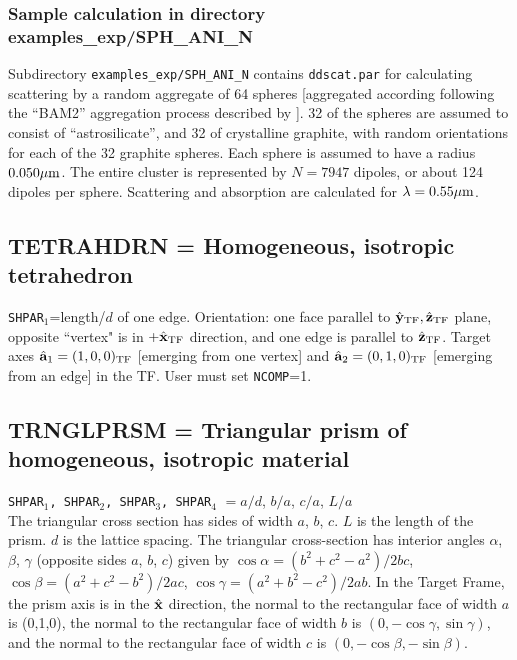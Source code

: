 \subsubsection{\bf Sample calculation in directory examples\_exp/SPH\_ANI\_N}

Subdirectory {\tt examples\_exp/SPH\_ANI\_N} contains {\tt ddscat.par} for
calculating scattering by a random aggregate of 64 spheres
[aggregated according following the ``BAM2'' aggregation process
described by \citet{Shen+Draine+Johnson_2008}].
32 of the spheres are assumed to consist of ``astrosilicate'', and
32 of crystalline graphite, with random orientations for each of the 32
graphite spheres.
Each sphere is assumed to have a radius $0.050{\mu{\rm m}}$.
The entire cluster is represented by $N=7947$ dipoles, or about 124 dipoles
per sphere.
Scattering and absorption are calculated for $\lambda=0.55{\mu{\rm m}}$.
\subsection{ TETRAHDRN = Homogeneous, isotropic tetrahedron
            \label{sec:TETRAHDRN}}
	{\tt SHPAR$_1$}=length/$d$ 
	of one edge. 
	Orientation: one face parallel to $\hat{\bf y}_{\rm TF},\hat{\bf z}_{\rm TF}$ plane,
	opposite ``vertex" is in $+\hat{\bf x}_{\rm TF}$ 
	direction, and one edge is parallel to $\hat{\bf z}_{\rm TF}$.
	Target axes ${\hat{\bf a}}_1=(1,0,0)_{\rm TF}$ [emerging from one vertex] 
        and ${\hat{\bf a}}_2=(0,1,0)_{\rm TF}$ [emerging from an edge] in the TF.
	User must set {\tt NCOMP}=1.
\subsection{ TRNGLPRSM = Triangular prism of homogeneous, isotropic material
            \label{sec:TRNGLPRSM}}
	{\tt SHPAR$_1$, SHPAR$_2$, SHPAR$_3$, SHPAR$_4$} $= a/d$, $b/a$, 
        $c/a$, $L/a$\\
	The triangular cross section has sides of width $a$, $b$, $c$.
	$L$ is the length of the prism.
	$d$ is the lattice spacing.
	The triangular cross-section 
	has interior angles $\alpha$, $\beta$, $\gamma$
	(opposite sides $a$, $b$, $c$) given by
	$\cos\alpha=(b^2+c^2-a^2)/2bc$, $\cos\beta=(a^2+c^2-b^2)/2ac$,
	$\cos\gamma=(a^2+b^2-c^2)/2ab$.
	In the Target Frame, the prism axis is in the $\hat{\bf x}$ direction,
	the normal to the rectangular face of width $a$ is (0,1,0), 
	the normal to the rectangular face of width $b$ is
	$(0,-\cos\gamma,\sin\gamma)$, and
	the normal to the rectangular face of width  $c$ is
	$(0,-\cos\beta,-\sin\beta)$.
